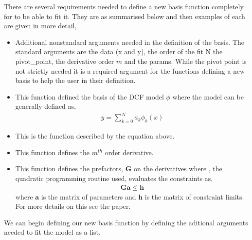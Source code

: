 \documentclass[letterpaper,10pt,english]{sphinxmanual}
\begin{document}
There are several requirements needed to define a new basis function completely
for  to be able to fit it. They are as summarised below and then
examples of each are given in more detail,
\begin{itemize}
\item {} 
 Additional non\sphinxhyphen{}standard  arguments needed in the definition of the
basis. The standard arguments are the data (x and y), the order of the fit N
the pivot\_point, the derivative order \({m}\) and the params. While the
pivot point is not strictly needed it is a required argument for the
functions defining a new basis to help the user in their definition.

\item {} 
 This function defined the basis of the DCF model
\({\phi}\) where the model can be generally defined as,
\begin{equation*}
\begin{split}y = \sum_{k = 0}^N a_k \phi_k(x)\end{split}
\end{equation*}
\item {} 
 This is the function described by the equation above.

\item {} 
 This function defines the \({m^{th}}\) order derivative.

\item {} 
 This function defines the prefactors,
\({\mathbf{G}}\) on the derivatives where , the quadratic
programming routine used, evaluates the constraints as,
\begin{equation*}
\begin{split}\mathbf{Ga} \leq \mathbf{h}\end{split}
\end{equation*}
where \({\mathbf{a}}\) is the matrix of parameters and \({\mathbf{h}}\)
is the matrix of constraint limits. For more details on this see the 
paper.

\end{itemize}

We can begin defining our new basis function by defining the aditional arguments
needed to fit the model as a list,

\begin{sphinxVerbatim}[commandchars=\\\{\}]
  \PYG{p}{[}\PYG{p}{[}\PYG{p}{]} \PYG{p}{[}\PYG{p}{]}\PYG{p}{]}
\end{sphinxVerbatim}
\end{document}
